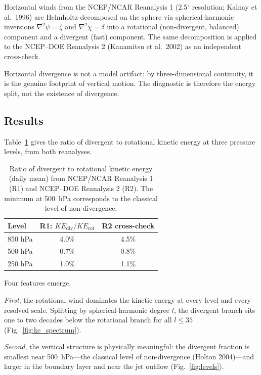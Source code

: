 \documentclass[11pt]{article}
\begin{document}
Horizontal winds from the NCEP/NCAR Reanalysis 1 (2.5$^\circ$ resolution; Kalnay et al.\ 1996) are Helmholtz-decomposed on the sphere via spherical-harmonic inversions $\nabla^2\psi = \zeta$ and $\nabla^2\chi = \delta$ into a rotational (non-divergent, balanced) component and a divergent (fast) component. The same decomposition is applied to the NCEP--DOE Reanalysis 2 (Kanamitsu et al.\ 2002) as an independent cross-check.

Horizontal divergence is not a model artifact: by three-dimensional continuity, it is the genuine footprint of vertical motion. The diagnostic is therefore the energy split, not the existence of divergence.

\subsection{Results}

Table~\ref{tab:reanalysis} gives the ratio of divergent to rotational kinetic energy at three pressure levels, from both reanalyses.

\begin{table}[t]
\centering
\caption{Ratio of divergent to rotational kinetic energy (daily mean) from
NCEP/NCAR Reanalysis 1 (R1) and NCEP--DOE Reanalysis 2 (R2). The minimum at
500~hPa corresponds to the classical level of non-divergence.}
\label{tab:reanalysis}
\begin{tabular}{lcc}
\toprule
Level & R1: $KE_{\mathrm{div}}/KE_{\mathrm{rot}}$ &
R2 cross-check \\
\midrule
850 hPa & 4.0\% & 4.5\% \\
500 hPa & 0.7\% & 0.8\% \\
250 hPa & 1.0\% & 1.1\% \\
\bottomrule
\end{tabular}
\end{table}

Four features emerge.

\emph{First}, the rotational wind dominates the kinetic energy at every level and every resolved scale. Splitting by spherical-harmonic degree $l$, the divergent branch sits one to two decades below the rotational branch for all $l \leq 35$ (Fig.~\ref{fig:ke_spectrum}).

\emph{Second}, the vertical structure is physically meaningful: the divergent fraction is smallest near 500~hPa---the classical level of non-divergence (Holton 2004)---and larger in the boundary layer and near the jet outflow (Fig.~\ref{fig:levels}).
\end{document}
